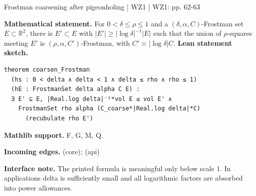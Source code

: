 \documentclass[10pt,a4paper]{article}
\newcommand{\nodecard}[1]{\hyperlink{node-#1}{\texttt{\detokenize{#1}}}}
\begin{document}
\begin{minipage}{\linewidth}
\hypertarget{node-L8_12}{}
\begin{tcolorbox}[colback=white,colframe=radialfg,colbacktitle=radialbg,coltitle=ink,boxrule=0.45pt,arc=1.6mm,left=3mm,right=3mm,top=2mm,bottom=2mm,title={\sffamily\bfseries WZ1 Lemma 8.12 \hfill \texttt{L8\_12}}]
{\sffamily\small\color{muted}Frostman coarsening after pigeonholing | WZ1 | WZ1: pp. 62-63}\par
\textbf{Mathematical statement.} For $0<\delta\le\rho\le1$ and a $(\delta,\alpha,C)$-Frostman set $E\subset\mathbb R^2$, there is $E'\subset E$ with $|E'|\ge|\log\delta|^{-1}|E|$ such that the union of $\rho$-squares meeting $E'$ is $(\rho,\alpha,C')$-Frostman, with $C'\asymp|\log\delta|C$.
\smallskip\textbf{Lean statement sketch.}
\begin{Verbatim}[fontsize=\small,breaklines=true,breakanywhere=true,tabsize=2]
theorem coarsen_Frostman
  (hs : 0 < delta ∧ delta < 1 ∧ delta ≤ rho ∧ rho ≤ 1)
  (hE : FrostmanSet delta alpha C E) :
  ∃ E' ⊆ E, |Real.log delta|⁻¹*vol E ≤ vol E' ∧
    FrostmanSet rho alpha (C_coarse*|Real.log delta|*C)
      (recubulate rho E')
\end{Verbatim}
{\footnotesize\textbf{Mathlib support.} F, G, M, Q.\par
\textbf{Incoming edges.} \nodecard{DFrost} (core); \nodecard{Imass} (api)\par}
{\footnotesize\textbf{Interface note.} The printed formula is meaningful only below scale 1. In applications delta is sufficiently small and all logarithmic factors are absorbed into power allowances.}
\end{tcolorbox}\end{minipage}\par\medskip
\end{document}
